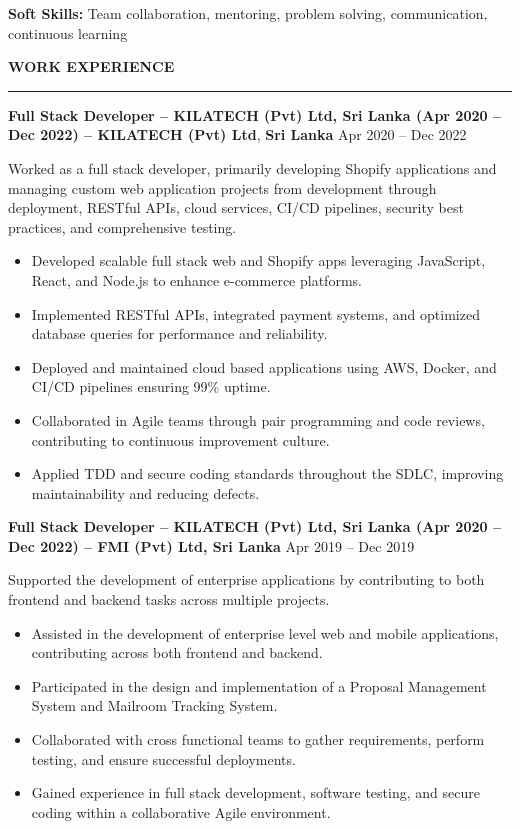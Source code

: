 \documentclass[10pt,letterpaper]{article}
\begin{document}
\textbf{Soft Skills:} Team collaboration, mentoring, problem solving, communication, continuous learning

\vspace{6pt}

\textbf{WORK EXPERIENCE}\\[-8pt]
\noindent\rule{\textwidth}{1pt}

\vspace{-2pt}

\textbf{Full Stack Developer – KILATECH (Pvt) Ltd, Sri Lanka (Apr 2020 – Dec 2022) -- KILATECH (Pvt) Ltd}, \textbf{Sri Lanka} \hfill Apr 2020 -- Dec 2022

\vspace{1pt}

Worked as a full stack developer, primarily developing Shopify applications and managing custom web application projects from development through deployment, RESTful APIs, cloud services, CI/CD pipelines, security best practices, and comprehensive testing.

\begin{itemize}
\item Developed scalable full stack web and Shopify apps leveraging JavaScript, React, and Node.js to enhance e-commerce platforms.
\item Implemented RESTful APIs, integrated payment systems, and optimized database queries for performance and reliability.
\item Deployed and maintained cloud based applications using AWS, Docker, and CI/CD pipelines ensuring 99\% uptime.
\item Collaborated in Agile teams through pair programming and code reviews, contributing to continuous improvement culture.
\item Applied TDD and secure coding standards throughout the SDLC, improving maintainability and reducing defects.
\end{itemize}

\textbf{Full Stack Developer – KILATECH (Pvt) Ltd, Sri Lanka (Apr 2020 – Dec 2022) -- FMI (Pvt) Ltd, Sri Lanka} \hfill Apr 2019 -- Dec 2019

\vspace{1pt}

Supported the development of enterprise applications by contributing to both frontend and backend tasks across multiple projects.

\begin{itemize}
\item Assisted in the development of enterprise level web and mobile applications, contributing across both frontend and backend.
\item Participated in the design and implementation of a Proposal Management System and Mailroom Tracking System.
\item Collaborated with cross functional teams to gather requirements, perform testing, and ensure successful deployments.
\item Gained experience in full stack development, software testing, and secure coding within a collaborative Agile environment.
\end{itemize}
\end{document}
